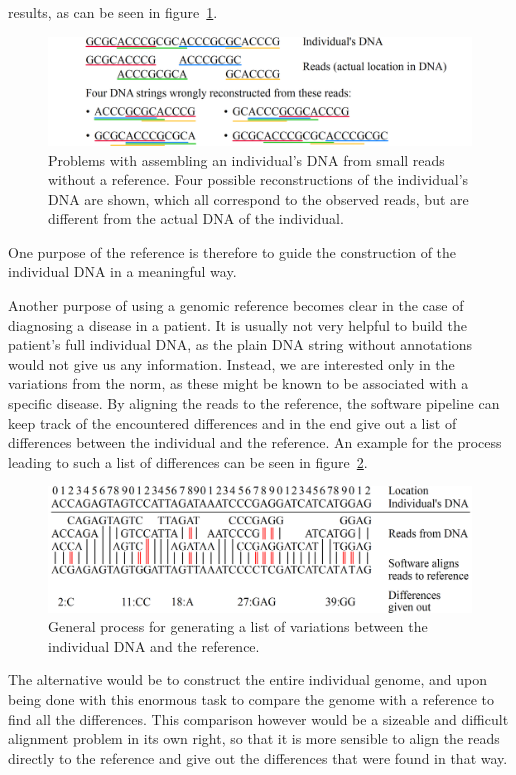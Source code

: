 \documentclass[a4paper,12pt,twoside,BCOR=10mm]{scrbook}
\begin{document}
results, as can be seen in figure~\ref{fig:evo_intro_assembly_wo_reference}.
\begin{figure}[!htb]
\centering
\includegraphics[width=\textwidth]{evo_intro_assembly_wo_reference.png}
\caption[Assembling an individual's DNA from small reads without a reference]{Problems with assembling an individual's DNA from small reads without a reference. Four possible reconstructions of the individual's DNA are shown, which all correspond to the observed reads, but are different from the actual DNA of the individual.} \label{fig:evo_intro_assembly_wo_reference}
\end{figure}
One purpose of the reference is therefore to guide the construction of the individual DNA in a meaningful way.

Another purpose of using a genomic reference becomes clear
in the case of diagnosing a disease in a patient.
It is usually not very helpful to build the patient's full individual DNA, as the plain DNA string without
annotations would not give us any information.
Instead, we are interested only in the variations from the norm,
as these might be known to be associated with a specific disease.
By aligning the reads to the reference, the software pipeline can keep track
of the encountered differences and in the end give out a list of differences between the individual and the reference.
An example for the process leading to such a list of differences
can be seen in figure~\ref{fig:evo_intro_general_variation_calling_process}.
\begin{figure}[!htb]
\centering
\includegraphics[width=\textwidth]{evo_intro_general_variation_calling_process.png}
\caption[General variation calling process]{General process for generating a list of variations between the individual DNA and the reference.} \label{fig:evo_intro_general_variation_calling_process}
\end{figure}
The alternative would be to construct the entire individual genome, and upon being done with this enormous task to
compare the genome with a reference to find all the differences. This comparison however would be a sizeable
and difficult alignment problem in its own right, so that it is more sensible to align the reads directly to the reference
and give out the differences that were found in that way.
\end{document}
